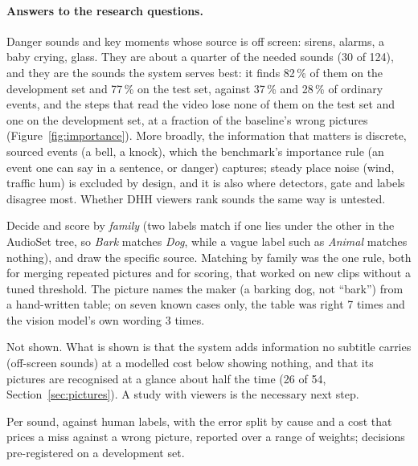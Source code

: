 \paragraph{Answers to the research questions.}
\begin{description}[style=nextline]
  \item[RQ1 -- which audio information matters most?] Danger sounds and key moments whose source is off screen:
        sirens, alarms, a baby crying, glass. They are about a quarter of the needed sounds (30 of 124), and they are
        the sounds the system serves best: it finds 82\,\% of them on the development set and 77\,\% on the test set,
        against 37\,\% and 28\,\% of ordinary events, and the steps that read the video lose none of them on the test set and one on
        the development set, at a fraction of the baseline's wrong pictures (Figure~\ref{fig:importance}). More broadly, the information that
        matters is discrete, sourced events (a bell, a knock), which the benchmark's importance rule (an event one can
        say in a sentence, or danger) captures; steady place noise (wind, traffic hum) is excluded by design, and it is
        also where detectors, gate and labels disagree most. Whether DHH viewers rank sounds the same way is untested.
  \item[RQ2 -- what granularity?] Decide and score by \emph{family} (two labels match if one lies under the other in
        the AudioSet tree, so \emph{Bark} matches \emph{Dog}, while a vague label such as \emph{Animal} matches nothing),
        and draw the specific source.
        Matching by family was the one rule, both for merging repeated pictures and for scoring, that worked on new
        clips without a tuned threshold. The picture names the maker (a barking dog, not ``bark'') from a hand-written
        table; on seven known cases only, the table was right 7 times and the vision model's own wording 3 times.
  \item[RQ3 -- can generated augmentations improve accessibility beyond subtitles?] Not shown. What is shown is that
        the system adds information no subtitle carries (off-screen sounds) at a modelled cost below showing nothing,
        and that its pictures are recognised at a glance about half the time (26 of 54, Section~\ref{sec:pictures}). A study with viewers is the necessary next
        step.
  \item[RQ4 -- how to evaluate?] Per sound, against human labels, with the error split by cause and a cost that prices
        a miss against a wrong picture, reported over a range of weights; decisions pre-registered on a development set.

\end{description}

